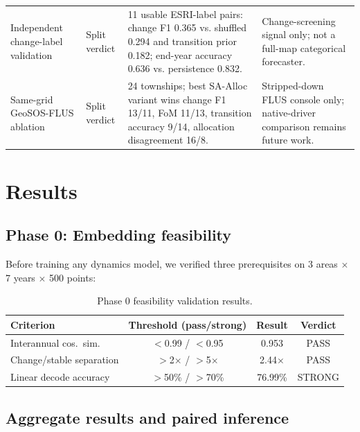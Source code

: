 \documentclass{article}
\begin{document}
\begin{table}[htbp]
\begin{tabular}{@{}P{0.20\textwidth}P{0.11\textwidth}P{0.37\textwidth}P{0.26\textwidth}@{}}
Independent change-label validation & Split verdict & 11 usable ESRI-label pairs: change F1 0.365 vs. shuffled 0.294 and transition prior 0.182; end-year accuracy 0.636 vs. persistence 0.832. & Change-screening signal only; not a full-map categorical forecaster. \\
Same-grid GeoSOS-FLUS ablation & Split verdict & 24 townships; best SA-Alloc variant wins change F1 13/11, FoM 11/13, transition accuracy 9/14, allocation disagreement 16/8. & Stripped-down FLUS console only; native-driver comparison remains future work. \\
\bottomrule
\end{tabular}
\renewcommand{\arraystretch}{1.0}
\end{table}


\section{Results}
\label{sec:results}

\subsection{Phase 0: Embedding feasibility}

Before training any dynamics model, we verified three prerequisites on 3 areas $\times$ 7 years $\times$ 500 points:

\begin{table}[htbp]
\centering
\caption{Phase 0 feasibility validation results.}
\label{tab:phase0}
\begin{tabular}{lccc}
\toprule
Criterion & Threshold (pass/strong) & Result & Verdict \\
\midrule
Interannual cos.~sim. & $<$0.99 / $<$0.95 & 0.953 & PASS \\
Change/stable separation & $>$2$\times$ / $>$5$\times$ & 2.44$\times$ & PASS \\
Linear decode accuracy & $>$50\% / $>$70\% & 76.99\% & STRONG \\
\bottomrule
\end{tabular}
\end{table}

\subsection{Aggregate results and paired inference}
\end{document}
